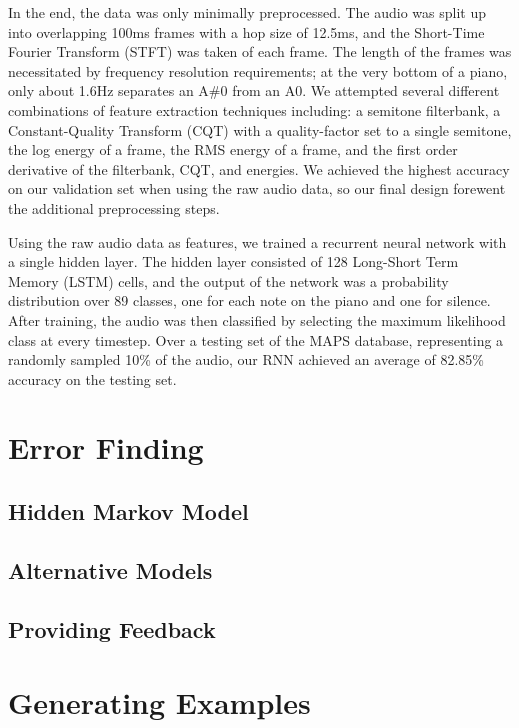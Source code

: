 \documentclass[twocolumn]{article}
\begin{document}
In the end, the data was only minimally preprocessed. The audio was split up into overlapping 100ms frames with a hop size of 12.5ms, and the Short-Time Fourier Transform (STFT) was taken of each frame. The length of the frames was necessitated by frequency resolution requirements; at the very bottom of a piano, only about 1.6Hz separates an A\#0 from an A0. We attempted several different combinations of feature extraction techniques including: a semitone filterbank, a Constant-Quality Transform (CQT) with a quality-factor set to a single semitone, the log energy of a frame, the RMS energy of a frame, and the first order derivative of the filterbank, CQT, and energies. We achieved the highest accuracy on our validation set when using the raw audio data, so our final design forewent the additional preprocessing steps.

Using the raw audio data as features, we trained a recurrent neural network with a single hidden layer. The hidden layer consisted of 128 Long-Short Term Memory (LSTM) cells, and the output of the network was a probability distribution over 89 classes, one for each note on the piano and one for silence. After training, the audio was then classified by selecting the maximum likelihood class at every timestep. Over a testing set of the MAPS database, representing a randomly sampled 10\% of the audio, our RNN achieved an average of 82.85\% accuracy on the testing set. 


\section{Error Finding}

\subsection{Hidden Markov Model}

\subsection{Alternative Models}

\subsection{Providing Feedback}

\section{Generating Examples}
\end{document}
